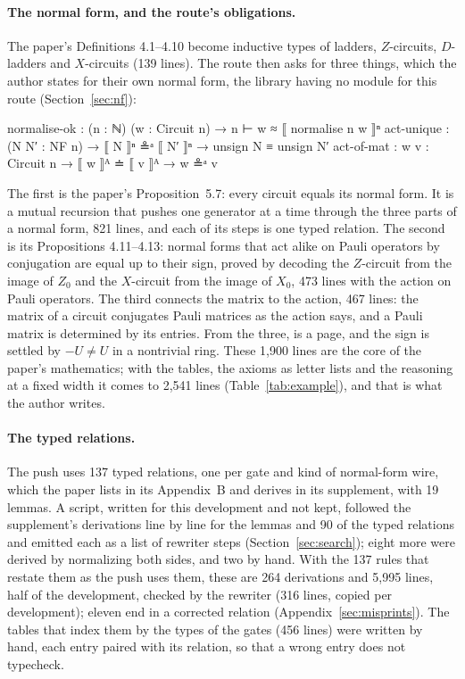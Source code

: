 \paragraph{The normal form, and the route's obligations.} The paper's
Definitions 4.1--4.10 become inductive types of ladders, $Z$-circuits,
$D$-ladders and $X$-circuits (139 lines). The route then asks for three
things, which the author states for their own normal form, the library
having no module for this route (Section~\ref{sec:nf}):
\begin{agdacode}
normalise-ok : (n : ℕ) (w : Circuit n) → n ⊢ w ≈ ⟦ normalise n w ⟧ⁿ
act-unique   : (N N′ : NF n) → ⟦ N ⟧ⁿ ≗ᵃ ⟦ N′ ⟧ⁿ → unsign N ≡ unsign N′
act-of-mat   : {w v : Circuit n} → ⟦ w ⟧ᴬ ≐ ⟦ v ⟧ᴬ → w ≗ᵃ v
\end{agdacode}
The first is the paper's Proposition~5.7: every circuit equals its
normal form. It is a mutual recursion that pushes one generator at a
time through the three parts of a normal form, 821 lines, and each of
its steps is one typed relation. The second is its Propositions
4.11--4.13: normal forms that act alike on Pauli operators by
conjugation are equal up to their sign, proved by decoding the
$Z$-circuit from the image of $Z_0$ and the $X$-circuit from the image
of $X_0$, 473 lines with the action on Pauli operators. The third
connects the matrix to the action, 467 lines: the matrix of a circuit
conjugates Pauli matrices as the action says, and a Pauli matrix is
determined by its entries. From the three,  is a
page, and the sign is settled by $-U\neq U$ in a nontrivial ring. These
1{,}900 lines are the core of the paper's mathematics; with the tables,
the axioms as letter lists and the reasoning at a fixed width it comes
to 2{,}541 lines (Table~\ref{tab:example}), and that is what the
author writes.

\paragraph{The typed relations.} The push uses 137 typed relations, one
per gate and kind of normal-form wire, which the paper lists in its
Appendix~B and derives in its supplement, with 19 lemmas. A script,
written for this development and not kept, followed the supplement's
derivations line by line for the lemmas and 90 of the typed relations
and emitted each as a list of rewriter steps (Section~\ref{sec:search});
eight more were derived by normalizing both sides, and two by hand.
With the 137 rules that restate them as the push uses them, these are
264 derivations and 5{,}995 lines, half of the development, checked by
the rewriter (316 lines, copied per development); eleven end in a
corrected relation (Appendix~\ref{sec:misprints}). The tables that
index them by the types of the gates (456 lines) were written by hand,
each entry paired with its relation, so that a wrong entry does not
typecheck.

